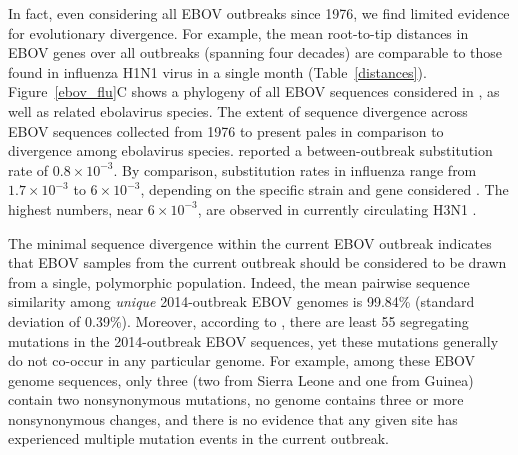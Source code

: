 \documentclass[11pt]{article}
\begin{document}
In fact, even considering all EBOV outbreaks since 1976, we find limited evidence for evolutionary divergence. For example, the mean root-to-tip distances in EBOV genes over all outbreaks (spanning four decades) are comparable to those found in influenza H1N1 virus in a single month (Table~\ref{distances}). Figure~\ref{ebov_flu}C shows a phylogeny of all EBOV sequences considered in \citet{Gire2014}, as well as related ebolavirus species. The extent of sequence divergence across EBOV sequences collected from 1976 to present pales in comparison to divergence among ebolavirus species. \citet{Gire2014} reported a between-outbreak substitution rate of $0.8\times10^{-3}$. By comparison, substitution rates in influenza range from $1.7\times10^{-3}$ to $6\times10^{-3}$, depending on the specific strain and gene considered \citep{Rambautetal2008,Smithetal2009,Bedfordetal2010,Quetal2011,Rocheetal2014}. The highest numbers, near $6\times10^{-3}$, are observed in currently circulating H3N1 \citep{Rambautetal2008,Bedfordetal2010}.

The minimal sequence divergence within the current EBOV outbreak indicates that EBOV samples from the current outbreak should be considered to be drawn from a single, polymorphic population. Indeed, the mean pairwise sequence similarity among \emph{unique} 2014-outbreak EBOV genomes is 99.84\% (standard deviation of 0.39\%). Moreover, according to \citet{Gire2014}, there are least 55 segregating mutations in the 2014-outbreak EBOV sequences, yet these mutations generally do not co-occur in any particular genome. For example, among these EBOV genome sequences, only three (two from Sierra Leone and one from Guinea) contain two nonsynonymous mutations, no genome contains three or more nonsynonymous changes, and there is no evidence that any given site has experienced multiple mutation events in the current outbreak.  
\end{document}
